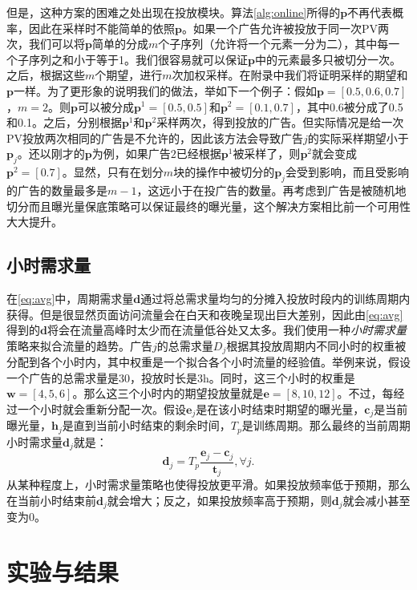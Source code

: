 \begin{enumerate}[1)]
	但是，这种方案的困难之处出现在投放模块。算法\ref{alg:online}所得的$\bm{p}$不再代表概率，因此在采样时不能简单的依照$\bm{p}$。如果一个广告允许被投放于同一次PV两次，我们可以将$\bm{p}$简单的分成$m$个子序列（允许将一个元素一分为二），其中每一个子序列之和小于等于1。我们很容易就可以保证$\bm{p}$中的元素最多只被切分一次。之后，根据这些$m$个期望，进行$m$次加权采样。在附录中我们将证明采样的期望和$\bm{p}$一样。为了更形象的说明我们的做法，举如下一个例子：假如$\bm{p} = [0.5, 0.6, 0.7]$，$m=2$。则$\bm{p}$可以被分成$\bm{p}^1 = [0.5, 0.5]$和$\bm{p}^2 = [0.1, 0.7]$，其中0.6被分成了0.5和0.1。之后，分别根据$\bm{p}^1$和$\bm{p}^2$采样两次，得到投放的广告。但实际情况是给一次PV投放两次相同的广告是不允许的，因此该方法会导致广告$j$的实际采样期望小于$\bm{p}_j$。还以刚才的$\bm{p}$为例，如果广告$2$已经根据$\bm{p}^1$被采样了，则$\bm{p}^2$就会变成$\bm{p}^2 = [0.7]$。显然，只有在划分$m$块的操作中被切分的$\bm{p}_j$会受到影响，而且受影响的广告的数量最多是$m-1$，这远小于在投广告的数量。再考虑到广告是被随机地切分而且曝光量保底策略可以保证最终的曝光量，这个解决方案相比前一个可用性大大提升。
	\end{enumerate}

\subsection{小时需求量} \label{subsec:hourly_d}

在\eqref{eq:avg}中，周期需求量$\bm{d}$通过将总需求量均匀的分摊入投放时段内的训练周期内获得。但是很显然页面访问流量会在白天和夜晚呈现出巨大差别，因此由\eqref{eq:avg}得到的$\bm{d}$将会在流量高峰时太少而在流量低谷处又太多。我们使用一种\textit{小时需求量}策略来拟合流量的趋势。广告$j$的总需求量$D_j$根据其投放周期内不同小时的权重被分配到各个小时内，其中权重是一个拟合各个小时流量的经验值。举例来说，假设一个广告的总需求量是30，投放时长是3h。同时，这三个小时的权重是$\bm{w} = [4, 5, 6]$。那么这三个小时内的期望投放量就是$\bm{e} = [8, 10, 12]$。不过，每经过一个小时就会重新分配一次。假设$\bm{e}_j$是在该小时结束时期望的曝光量，$\bm{c}_j$是当前曝光量，$\bm{h}_j$是直到当前小时结束的剩余时间，$T_p$是训练周期。那么最终的当前周期小时需求量$\bm{d}_j$就是：
\begin{equation}
\bm{d}_j = T_{p}\frac{\bm{e}_j - \bm{c}_j}{\bm{t}_j}, \forall j.
\end{equation}
从某种程度上，小时需求量策略也使得投放更平滑。如果投放频率低于预期，那么在当前小时结束前$\bm{d}_j$就会增大；反之，如果投放频率高于预期，则$\bm{d}_j$就会减小甚至变为0。

\section{实验与结果}

